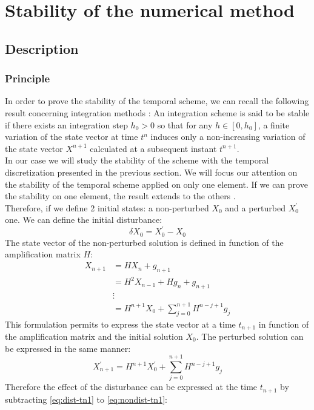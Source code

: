 \section{Stability of the numerical method}
\subsection{Description}
\subsubsection{Principle}
In order to prove the stability of the temporal scheme, we can recall the following result concerning integration methods \cite{Geradin}: An integration scheme is said to be stable if there exists an integration step $h_0 > 0$ so that for any $h \in [0, h_0]$, a finite variation of the state vector at time $t^n$ induces only a non-increasing variation of the state vector $X^{n+1}$ calculated at a subsequent instant $t^{n+1}$.\\
In our case we will study the stability of the scheme with the temporal discretization presented in the previous section. We will focus our attention on the stability of the temporal scheme applied on only one element. If we can prove the stability on one element, the result extends to the others \cite{Belytschko}. \\
Therefore, if we define 2 initial states: a non-perturbed $X_0$  and a perturbed $X^\prime_0$ one. We can define the initial disturbance:
\begin{equation}
\delta X_0 = X^\prime_0 - X_0
\end{equation}
The state vector of the non-perturbed solution is defined in function of the amplification matrix $H$:
\begin{align}
X_{n+1} &= H X_n + g_{n+1} \\
&= H^2 X_{n-1} + Hg_n + g_{n+1} \\
&\vdots\\
&= H^{n+1}X_0 + \sum^{n+1}_{j=0} H^{n-j+1}g_j
\label{eq:nondist-tn1}
\end{align}
This formulation permits to express the state vector at a time $t_{n+1}$ in function of the amplification matrix and the initial solution $X_0$. The perturbed solution can be expressed in the same manner:
\begin{equation}
X^\prime_{n+1} = H^{n+1}X_0^\prime + \sum^{n+1}_{j=0} H^{n-j+1}g_j
\label{eq:dist-tn1}
\end{equation}
Therefore the effect of the disturbance can be expressed at the time $t_{n+1}$ by subtracting \ref{eq:dist-tn1} to \ref{eq:nondist-tn1}:
